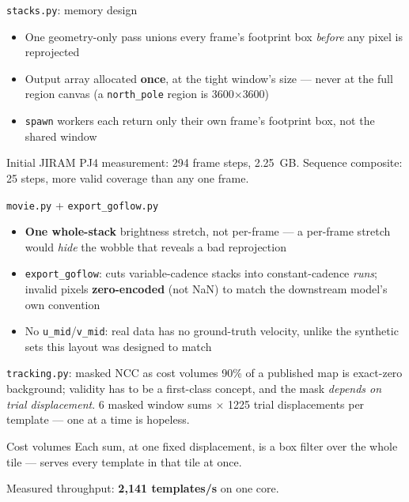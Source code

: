 \documentclass[aspectratio=169,11pt]{beamer}
\newcommand{\currevsec}{}
\newcommand{\revsec}[1]{\gdef\currevsec{#1}}
\begin{document}
\begin{frame}{\texttt{stacks.py}: memory design}
  \revsec{4.10}
  \begin{itemize}
    \item One geometry-only pass unions every frame's footprint box \emph{before} any pixel is reprojected
    \item Output array allocated \textbf{once}, at the tight window's size --- never at the full region canvas (a \texttt{north\_pole} region is 3600$\times$3600)
    \item \texttt{spawn} workers each return only their own frame's footprint box, not the shared window
  \end{itemize}
  Initial JIRAM PJ4 measurement: 294 frame steps, 2.25~GB. Sequence composite: 25 steps, more valid coverage than any one frame.
\end{frame}

\begin{frame}{\texttt{movie.py} + \texttt{export\_goflow.py}}
  \revsec{4.11}
  \begin{itemize}
    \item \textbf{One whole-stack} brightness stretch, not per-frame --- a per-frame stretch would \emph{hide} the wobble that reveals a bad reprojection
    \item \texttt{export\_goflow}: cuts variable-cadence stacks into constant-cadence \emph{runs}; invalid pixels \textbf{zero-encoded} (not NaN) to match the downstream model's own convention
    \item No \texttt{u\_mid}/\texttt{v\_mid}: real data has no ground-truth velocity, unlike the synthetic sets this layout was designed to match
  \end{itemize}
\end{frame}

\begin{frame}{\texttt{tracking.py}: masked NCC as cost volumes}
  \revsec{4.12}
  90\% of a published map is exact-zero background; validity has to be a first-class concept, and the mask \emph{depends on trial displacement}.
  \vspace{0.2cm}
  6 masked window sums $\times$ 1225 trial displacements per template --- one at a time is hopeless.
  \begin{block}{Cost volumes}
    Each sum, at one fixed displacement, is a box filter over the whole tile --- serves every template in that tile at once.
  \end{block}
  Measured throughput: \textbf{2{,}141 templates/s} on one core.
\end{frame}
\end{document}
